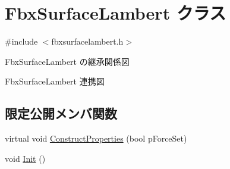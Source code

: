 \hypertarget{class_fbx_surface_lambert}{}\section{Fbx\+Surface\+Lambert クラス}
\label{class_fbx_surface_lambert}


{\ttfamily \#include $<$fbxsurfacelambert.\+h$>$}



Fbx\+Surface\+Lambert の継承関係図


Fbx\+Surface\+Lambert 連携図
\subsection*{限定公開メンバ関数}
\begin{DoxyCompactItemize}
\item 
virtual void \hyperlink{class_fbx_surface_lambert_a6693e1c08050978c78eece2aa48688e9}{Construct\+Properties} (bool p\+Force\+Set)
\item 
void \hyperlink{class_fbx_surface_lambert_adacdc8eb6bcebc3cdd8e134d5a01f1b1}{Init} ()
\end{DoxyCompactItemize}
